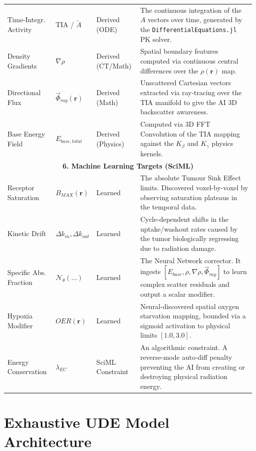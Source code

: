 \documentclass[11pt,a4paper]{article}
\begin{document}
\begin{table}[h!]
\begin{tabularx}{\textwidth}{@{}l l l X@{}}
Time-Integr. Activity & TIA / $\tilde{A}$ & Derived (ODE) & The continuous integration of the $A$ vectors over time, generated by the \texttt{DifferentialEquations.jl} PK solver. \\
Density Gradients & $\nabla \rho$ & Derived (CT/Math) & Spatial boundary features computed via continuous central differences over the $\rho(\mathbf{r})$ map. \\
Directional Flux & $\vec{\Phi}_{ray}(\mathbf{r})$ & Derived (Math) & Unscattered Cartesian vectors extracted via ray-tracing over the TIA manifold to give the AI 3D backscatter awareness. \\
Base Energy Field & $E_{base, total}$ & Derived (Physics) & Computed via 3D FFT Convolution of the TIA mapping against the $K_\beta$ and $K_\gamma$ physics kernels. \\ \midrule
\multicolumn{4}{c}{\textbf{6. Machine Learning Targets (SciML)}} \\ \midrule
Receptor Saturation & $B_{MAX}(\mathbf{r})$ & Learned & The absolute Tumour Sink Effect limits. Discovered voxel-by-voxel by observing saturation plateaus in the temporal data. \\
Kinetic Drift & $\Delta k_{in}, \Delta k_{out}$ & Learned & Cycle-dependent shifts in the uptake/washout rates caused by the tumor biologically regressing due to radiation damage. \\
Specific Abs. Fraction & $\mathcal{N}_\theta(\dots)$ & Learned & The Neural Network corrector. It ingests $[E_{base}, \rho, \nabla \rho, \vec{\Phi}_{ray}]$ to learn complex scatter residuals and output a scalar modifier. \\
Hypoxia Modifier & $OER(\mathbf{r})$ & Learned & Neural-discovered spatial oxygen starvation mapping, bounded via a sigmoid activation to physical limits $[1.0, 3.0]$. \\
Energy Conservation & $\lambda_{EC}$ & SciML Constraint & An algorithmic constraint. A reverse-mode auto-diff penalty preventing the AI from creating or destroying physical radiation energy. \\ \bottomrule
\end{tabularx}
\end{table}

\section{Exhaustive UDE Model Architecture}
\end{document}

